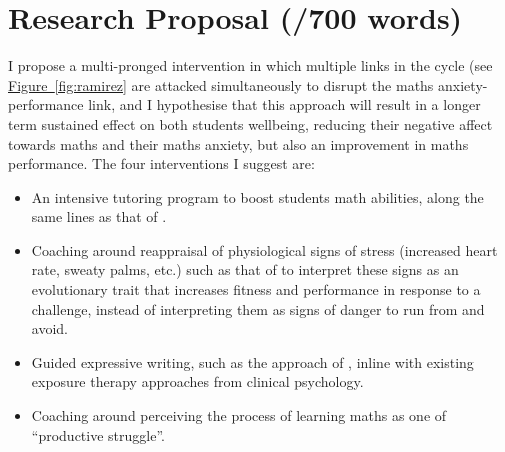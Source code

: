 \documentclass[14pt]{memoir}
\newcommand{\reffig}[1]{\hyperref[fig:#1]{Figure~\ref{fig:#1}}}
\begin{document}
%



\section{Research Proposal (/700 words)}

I propose a multi-pronged intervention in which multiple links in the cycle (see \reffig{ramirez} are attacked simultaneously to disrupt the maths anxiety-performance link, and I hypothesise that this approach will result in a longer term sustained effect on both students wellbeing, reducing their negative affect towards maths and their maths anxiety, but also an improvement in maths performance. The four interventions I suggest are:
\begin{itemize}
	\item An intensive tutoring program to boost students math abilities, along the same lines as that of .
	\item Coaching around reappraisal of physiological signs of stress (increased heart rate, sweaty palms, etc.) such as that of  to interpret these signs as an evolutionary trait that increases fitness and performance in response to a challenge, instead of interpreting them as signs of danger to run from and avoid.
	\item Guided expressive writing, such as the approach of , inline with existing exposure therapy approaches from clinical psychology.
	\item Coaching around perceiving the process of learning maths as one of ``productive struggle''.
\end{itemize}
\end{document}
